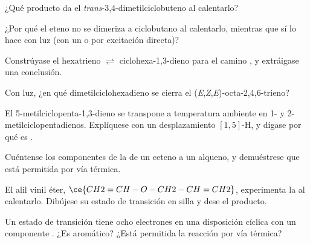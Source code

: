 \begin{exercise}[$\star$]\label{exo:b3:pericyclic:3}
¿Qué producto da el \textit{trans}-3,4-dimetilciclobuteno al calentarlo?
\end{exercise}

\begin{exercise}[$\star$]\label{exo:b3:pericyclic:4}
¿Por qué el eteno no se dimeriza a ciclobutano al calentarlo, mientras que sí lo hace con luz
(con un  o por excitación directa)?
\end{exercise}

\begin{exercise}[$\star\star$]\label{exo:b3:pericyclic:5}
Constrúyase el  hexatrieno $\rightleftharpoons$ ciclohexa-1,3-dieno para el
camino , y extráigase una conclusión.
\end{exercise}

\begin{exercise}[$\star\star$]\label{exo:b3:pericyclic:6}
Con luz, ¿en qué dimetilciclohexadieno se cierra el (\textit{E},\textit{Z},\textit{E})-octa-2,4,6-trieno?
\end{exercise}

\begin{exercise}[$\star\star$]\label{exo:b3:pericyclic:7}
El 5-metilciclopenta-1,3-dieno se transpone a temperatura ambiente en 1- y
2-metilciclopentadienos. Explíquese con un desplazamiento $[1,5]$-H, y dígase por qué es .
\end{exercise}

\begin{exercise}[$\star\star$]\label{exo:b3:pericyclic:8}
Cuéntense los componentes de la  de un ceteno a un alqueno, y demuéstrese
que está permitida por vía térmica.
\end{exercise}

\begin{exercise}[$\star\star$]\label{exo:b3:pericyclic:9}
El alil vinil éter, $\ce{CH2=CH-O-CH2-CH=CH2}$, experimenta la  al
calentarlo. Dibújese su estado de transición en silla y dese el producto.
\end{exercise}

\begin{exercise}[$\star\star\star$]\label{exo:b3:pericyclic:10}
Un estado de transición tiene ocho electrones en una disposición cíclica con un componente
. ¿Es aromático? ¿Está permitida la reacción por vía térmica?
\end{exercise}

